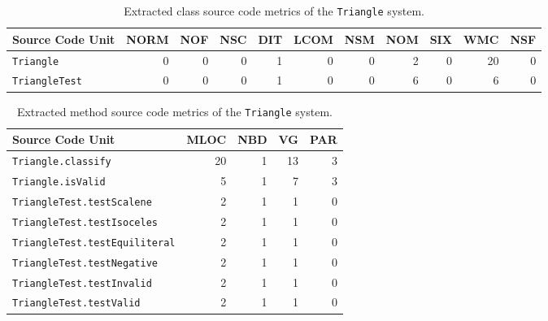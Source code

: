 \begin{landscape}
  \begin{table}[h]
    \centering
    \begin{tabular}{|l|r|r|r|r|r|r|r|r|r|r|}
      \hline
      \rowcolor[RGB]{169,196,223}
      \textbf{Source Code Unit} & \textbf{NORM} & \textbf{NOF} & \textbf{NSC} & \textbf{DIT} & \textbf{LCOM} & \textbf{NSM} & \textbf{NOM} & \textbf{SIX} & \textbf{WMC} & \textbf{NSF} \\
      \hline \texttt{Triangle} & 0 & 0 & 0 & 1 & 0 & 0 & 2 & 0 & 20 & 0 \\
      \hline \texttt{TriangleTest} & 0 & 0 & 0 & 1 & 0 & 0 & 6 & 0 & 6 & 0 \\
      \hline
    \end{tabular}
    \caption{Extracted class source code metrics of the \texttt{Triangle} system.}
    \label{tab:triangle_class_extracted_metrics}
  \end{table}

  \begin{table}[h]
    \centering
    \begin{tabular}{|l|r|r|r|r|}
      \hline
      \rowcolor[RGB]{169,196,223}
      \textbf{Source Code Unit} & \textbf{MLOC} & \textbf{NBD} & \textbf{VG} & \textbf{PAR} \\
      \hline \texttt{Triangle.classify} & 20 & 1 & 13 & 3 \\
      \hline \texttt{Triangle.isValid} & 5 & 1 & 7 & 3 \\
      \hline \texttt{TriangleTest.testScalene} & 2 & 1 & 1 & 0 \\
      \hline \texttt{TriangleTest.testIsoceles} & 2 & 1 & 1 & 0 \\
      \hline \texttt{TriangleTest.testEquiliteral} & 2 & 1 & 1 & 0 \\
      \hline \texttt{TriangleTest.testNegative} & 2 & 1 & 1 & 0 \\
      \hline \texttt{TriangleTest.testInvalid} & 2 & 1 & 1 & 0 \\
      \hline \texttt{TriangleTest.testValid} & 2 & 1 & 1 & 0 \\
      \hline
    \end{tabular}
    \caption{Extracted method source code metrics of the \texttt{Triangle} system.}
    \label{tab:triangle_method_extracted_metrics}
  \end{table}
\end{landscape}


